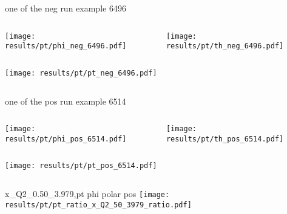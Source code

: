 \begin{frame}{one of the neg run example 6496}
\begin{columns}
\begin{column}[T]{0.5\textwidth}
\texttt{[image: results/pt/phi\_neg\_6496.pdf]}
\end{column}
\begin{column}[T]{0.5\textwidth}
\texttt{[image: results/pt/th\_neg\_6496.pdf]}
\end{column}
\end{columns}
\begin{columns}
\begin{column}[T]{0.5\textwidth}
\texttt{[image: results/pt/pt\_neg\_6496.pdf]}
\end{column}
\begin{column}[T]{0.5\textwidth}
\end{column}
\end{columns}
\end{frame}
\begin{frame}{one of the pos run example 6514}
\begin{columns}
\begin{column}[T]{0.5\textwidth}
\texttt{[image: results/pt/phi\_pos\_6514.pdf]}
\end{column}
\begin{column}[T]{0.5\textwidth}
\texttt{[image: results/pt/th\_pos\_6514.pdf]}
\end{column}
\end{columns}
\begin{columns}
\begin{column}[T]{0.5\textwidth}
\texttt{[image: results/pt/pt\_pos\_6514.pdf]}
\end{column}
\begin{column}[T]{0.5\textwidth}
\end{column}
\end{columns}
\end{frame}
\begin{frame}{x\_Q2\_0.50\_3.979,pt phi polar pos}
\texttt{[image: results/pt/pt\_ratio\_x\_Q2\_50\_3979\_ratio.pdf]}
\end{frame}
